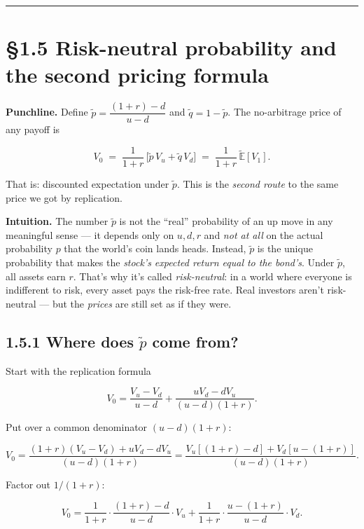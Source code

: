 \documentclass[
  10pt,
  twoside]{book}
\begin{document}
\begin{center}\rule{0.5\linewidth}{0.5pt}\end{center}

\section{§1.5 Risk-neutral probability and the second pricing
formula}\label{risk-neutral-probability-and-the-second-pricing-formula}

\textbf{Punchline.} Define \(\tilde p = \dfrac{(1+r)-d}{u-d}\) and
\(\tilde q = 1-\tilde p\). The no-arbitrage price of any payoff is

\[\boxed{V_0 \;=\; \frac{1}{1+r}\,\bigl[\tilde p\, V_u + \tilde q\, V_d\bigr]\;=\;\frac{1}{1+r}\,\widetilde{\mathbb E}[V_1].}\]

That is: discounted expectation under \(\tilde p\). This is the
\emph{second route} to the same price we got by replication.

\textbf{Intuition.} The number \(\tilde p\) is not the ``real''
probability of an up move in any meaningful sense --- it depends only on
\(u,d,r\) and \emph{not at all} on the actual probability \(p\) that the
world's coin lands heads. Instead, \(\tilde p\) is the unique
probability that makes the \emph{stock's expected return equal to the
bond's}. Under \(\tilde p\), all assets earn \(r\). That's why it's
called \emph{risk-neutral}: in a world where everyone is indifferent to
risk, every asset pays the risk-free rate. Real investors aren't
risk-neutral --- but the \emph{prices} are still set as if they were.

\subsection{\texorpdfstring{1.5.1 Where does \(\tilde p\) come
from?}{1.5.1 Where does \textbackslash tilde p come from?}}\label{where-does-tilde-p-come-from}

Start with the replication formula

\[V_0 = \frac{V_u-V_d}{u-d} + \frac{uV_d - dV_u}{(u-d)(1+r)}.\]

Put over a common denominator \((u-d)(1+r)\):

\[V_0 = \frac{(1+r)(V_u-V_d) + uV_d - dV_u}{(u-d)(1+r)} = \frac{V_u[(1+r) - d] + V_d[u - (1+r)]}{(u-d)(1+r)}.\]

Factor out \(1/(1+r)\):

\[V_0 = \frac{1}{1+r}\cdot \frac{(1+r)-d}{u-d}\cdot V_u + \frac{1}{1+r}\cdot\frac{u-(1+r)}{u-d}\cdot V_d.\]
\end{document}
